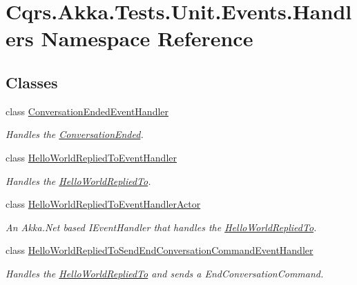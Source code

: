 \hypertarget{namespaceCqrs_1_1Akka_1_1Tests_1_1Unit_1_1Events_1_1Handlers}{}\section{Cqrs.\+Akka.\+Tests.\+Unit.\+Events.\+Handlers Namespace Reference}
\label{namespaceCqrs_1_1Akka_1_1Tests_1_1Unit_1_1Events_1_1Handlers}
\subsection*{Classes}
\begin{DoxyCompactItemize}
\item 
class \hyperlink{classCqrs_1_1Akka_1_1Tests_1_1Unit_1_1Events_1_1Handlers_1_1ConversationEndedEventHandler}{Conversation\+Ended\+Event\+Handler}
\begin{DoxyCompactList}\small\item\em Handles the \hyperlink{classCqrs_1_1Akka_1_1Tests_1_1Unit_1_1Events_1_1ConversationEnded}{Conversation\+Ended}. \end{DoxyCompactList}\item 
class \hyperlink{classCqrs_1_1Akka_1_1Tests_1_1Unit_1_1Events_1_1Handlers_1_1HelloWorldRepliedToEventHandler}{Hello\+World\+Replied\+To\+Event\+Handler}
\begin{DoxyCompactList}\small\item\em Handles the \hyperlink{classCqrs_1_1Akka_1_1Tests_1_1Unit_1_1Events_1_1HelloWorldRepliedTo}{Hello\+World\+Replied\+To}. \end{DoxyCompactList}\item 
class \hyperlink{classCqrs_1_1Akka_1_1Tests_1_1Unit_1_1Events_1_1Handlers_1_1HelloWorldRepliedToEventHandlerActor}{Hello\+World\+Replied\+To\+Event\+Handler\+Actor}
\begin{DoxyCompactList}\small\item\em An Akka.\+Net based I\+Event\+Handler that handles the \hyperlink{classCqrs_1_1Akka_1_1Tests_1_1Unit_1_1Events_1_1HelloWorldRepliedTo}{Hello\+World\+Replied\+To}. \end{DoxyCompactList}\item 
class \hyperlink{classCqrs_1_1Akka_1_1Tests_1_1Unit_1_1Events_1_1Handlers_1_1HelloWorldRepliedToSendEndConversationCommandEventHandler}{Hello\+World\+Replied\+To\+Send\+End\+Conversation\+Command\+Event\+Handler}
\begin{DoxyCompactList}\small\item\em Handles the \hyperlink{classCqrs_1_1Akka_1_1Tests_1_1Unit_1_1Events_1_1HelloWorldRepliedTo}{Hello\+World\+Replied\+To} and sends a End\+Conversation\+Command. \end{DoxyCompactList}\item 

\end{DoxyCompactItemize}
